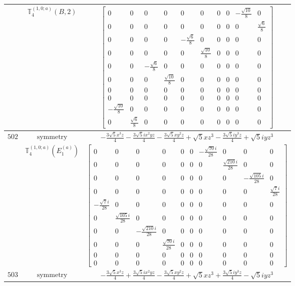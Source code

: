 \documentclass[fleqn,8pt,landscape]{jsarticle}
\begin{document}
\begin{longtable}{ccc}
$  $ & $ \mathbb{T}_{4}^{(1,0;a)}(B,2) $ & $ \begin{bmatrix} 0 & 0 & 0 & 0 & 0 & 0 & 0 & 0 & - \frac{\sqrt{10}}{8} & 0 \\ 0 & 0 & 0 & 0 & 0 & 0 & 0 & 0 & 0 & \frac{\sqrt{6}}{8} \\ 0 & 0 & 0 & 0 & - \frac{\sqrt{6}}{8} & 0 & 0 & 0 & 0 & 0 \\ 0 & 0 & 0 & 0 & 0 & \frac{\sqrt{10}}{8} & 0 & 0 & 0 & 0 \\ 0 & 0 & - \frac{\sqrt{6}}{8} & 0 & 0 & 0 & 0 & 0 & 0 & 0 \\ 0 & 0 & 0 & \frac{\sqrt{10}}{8} & 0 & 0 & 0 & 0 & 0 & 0 \\ 0 & 0 & 0 & 0 & 0 & 0 & 0 & 0 & 0 & 0 \\ 0 & 0 & 0 & 0 & 0 & 0 & 0 & 0 & 0 & 0 \\ - \frac{\sqrt{10}}{8} & 0 & 0 & 0 & 0 & 0 & 0 & 0 & 0 & 0 \\ 0 & \frac{\sqrt{6}}{8} & 0 & 0 & 0 & 0 & 0 & 0 & 0 & 0 \end{bmatrix} $ \\ \hline
$ 502 $ & $ \text{symmetry} $ & $ - \frac{3 \sqrt{5} x^{3} z}{4} - \frac{3 \sqrt{5} i x^{2} y z}{4} - \frac{3 \sqrt{5} x y^{2} z}{4} + \sqrt{5} x z^{3} - \frac{3 \sqrt{5} i y^{3} z}{4} + \sqrt{5} i y z^{3} $ \\
$  $ & $ \mathbb{T}_{4}^{(1,0;a)}(E_{1}^{(a)}) $ & $ \begin{bmatrix} 0 & 0 & 0 & 0 & 0 & 0 & - \frac{\sqrt{70} i}{28} & 0 & 0 & 0 \\ 0 & 0 & 0 & 0 & 0 & 0 & 0 & \frac{\sqrt{210} i}{28} & 0 & 0 \\ 0 & 0 & 0 & 0 & 0 & 0 & 0 & 0 & - \frac{\sqrt{105} i}{28} & 0 \\ 0 & 0 & 0 & 0 & 0 & 0 & 0 & 0 & 0 & \frac{\sqrt{7} i}{28} \\ - \frac{\sqrt{7} i}{28} & 0 & 0 & 0 & 0 & 0 & 0 & 0 & 0 & 0 \\ 0 & \frac{\sqrt{105} i}{28} & 0 & 0 & 0 & 0 & 0 & 0 & 0 & 0 \\ 0 & 0 & - \frac{\sqrt{210} i}{28} & 0 & 0 & 0 & 0 & 0 & 0 & 0 \\ 0 & 0 & 0 & \frac{\sqrt{70} i}{28} & 0 & 0 & 0 & 0 & 0 & 0 \\ 0 & 0 & 0 & 0 & 0 & 0 & 0 & 0 & 0 & 0 \\ 0 & 0 & 0 & 0 & 0 & 0 & 0 & 0 & 0 & 0 \end{bmatrix} $ \\ \hline
$ 503 $ & $ \text{symmetry} $ & $ - \frac{3 \sqrt{5} x^{3} z}{4} + \frac{3 \sqrt{5} i x^{2} y z}{4} - \frac{3 \sqrt{5} x y^{2} z}{4} + \sqrt{5} x z^{3} + \frac{3 \sqrt{5} i y^{3} z}{4} - \sqrt{5} i y z^{3} $ \\

\end{longtable}
\end{document}
